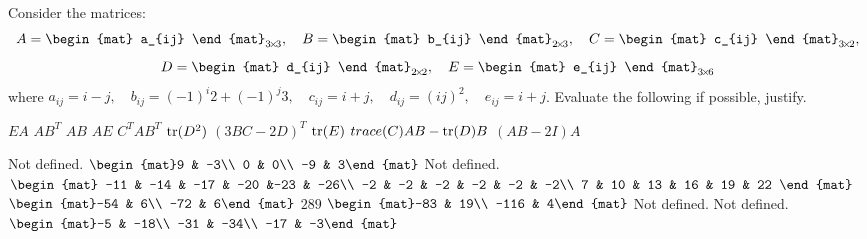 
\begin{Exercise}[
name={},
title={}, 
difficulty=0,
origin={\cite{YL}}]
Consider the matrices:
\[
A=
\begin{mat}
a_{ij}
\end{mat}_{\nbyn{3}},\quad
B=
\begin{mat}
b_{ij}
\end{mat}_{\nbym{2}{3}},\quad
C=
\begin{mat}
c_{ij}
\end{mat}_{\nbym{3}{2}},
\]
\[
D=
\begin{mat}
d_{ij}
\end{mat}_{\nbyn{2}},\quad
E=
\begin{mat}
e_{ij}
\end{mat}_{\nbym{3}{6}}
\]
where $a_{ij}=i-j,\quad b_{ij}=(-1)^i2+(-1)^j3,\quad c_{ij}=i+j,\quad d_{ij}=(ij)^2,\quad e_{ij}=i+j$.  Evaluate the following if possible, justify.
\begin{multicols}{3}
\Question $EA$
\Question $AB^T$
\Question $AB$
\Question $AE$
\Question $C^TAB^T$
\Question $\operatorname{tr}(D^2)$
\Question $(3BC-2D)^T$
\Question $\operatorname{tr}(E)$
\Question $trace(C)AB - \operatorname{tr}(D)B$
\Question $(AB-2I)A$
\EndCurrentQuestion
\end{multicols}
\end{Exercise}

\begin{Answer}
\Question Not defined.
\Question $\begin{mat}9 & -3\\ 0 & 0\\ -9 & 3\end{mat}$
\Question Not defined.
\Question $\begin{mat} -11 & -14 & -17 & -20 &-23 & -26\\
-2 & -2 & -2 & -2 & -2 & -2\\
7 & 10 & 13 & 16 & 19 & 22
\end{mat}$
\Question $\begin{mat}-54 & 6\\ -72 & 6\end{mat}$
\Question $289$
\Question $\begin{mat}-83 & 19\\ -116 & 4\end{mat}$
\Question Not defined.
\Question Not defined.
\Question $\begin{mat}-5 & -18\\ -31 & -34\\ -17 & -3\end{mat}$
\end{Answer}
